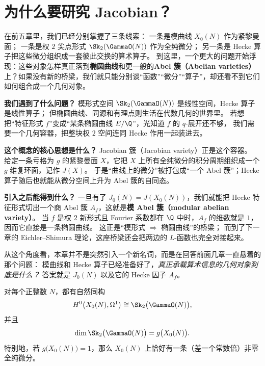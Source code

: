 \section{为什么要研究 Jacobian？}
\label{sec:jacobian-motivation}

在前五章里，我们已经分别掌握了三条线索：
一条是模曲线 $X_0(N)$ 作为紧黎曼面；
一条是权 $2$ 尖点形式 $\Sk_2(\GammaO(N))$ 作为全纯微分；
另一条是 Hecke 算子把这些微分组织成一套彼此交换的算术算子。
到这里，一个更大的问题开始浮现：这些对象怎样真正落到\textbf{椭圆曲线}和更一般的\textbf{Abel 簇（Abelian varieties）}上？如果没有新的桥梁，我们就只能分别谈“函数”“微分”“算子”，却还看不到它们如何组合成一个几何对象。

\textbf{我们遇到了什么问题？}
模形式空间 $\Sk_2(\GammaO(N))$ 是线性空间，Hecke 算子是线性算子；
但椭圆曲线、同源和有理点则生活在代数几何的世界里。
若想把“特征形式 $f$”变成“某条椭圆曲线 $E/\Q$”，光知道 $f$ 的 $q$-展开还不够，
我们需要一个几何容器，把整块权 $2$ 空间连同 Hecke 作用一起装进去。

\textbf{这个概念的核心思想是什么？}
Jacobian 簇（Jacobian variety）正是这个容器。
给定一条亏格为 $g$ 的紧黎曼面 $X$，它把 $X$ 上所有全纯微分的积分周期组织成一个 $g$ 维复环面，记作 $J(X)$。
于是“曲线上的微分”被打包成“一个 Abel 簇”；Hecke 算子随后也就能从微分空间上升为 Abel 簇的自同态。

\textbf{引入之后能得到什么？}
一旦有了 $J_0(N)=J(X_0(N))$，我们就能把 Hecke 特征形式切出一个商 Abel 簇
$A_f$，这就是\textbf{模 Abel 簇（modular abelian variety）}。
当 $f$ 是权 $2$ 新形式且 Fourier 系数都在 $\Q$ 中时，$A_f$ 的维数就是 $1$，因而它直接是一条椭圆曲线。
这正是“模形式 $\Rightarrow$ 椭圆曲线”的桥梁；
而到了下一章的 Eichler--Shimura 理论，这座桥梁还会把两边的 $L$-函数也完全对接起来。



从这个角度看，本章并不是突然引入一个新名词，而是在回答前面几章一直悬着的那个问题：
模曲线和 Hecke 算子已经准备好了，\emph{真正承载算术信息的几何对象到底是什么？}
答案就是 $J_0(N)$ 以及它的 Hecke 因子 $A_f$。

\begin{proposition}[前五章留下的权 $2$ 数据]
\label{prop:weight2-data-for-jacobian}
对每个正整数 $N$，都有自然同构
\[
  H^0\bigl(X_0(N),\Omega^1\bigr)\cong \Sk_2\bigl(\GammaO(N)\bigr),
\]
并且
\[
  \dim \Sk_2\bigl(\GammaO(N)\bigr)=g\bigl(X_0(N)\bigr).
\]
特别地，若 $g\bigl(X_0(N)\bigr)=1$，那么 $X_0(N)$ 上恰好有一条（差一个常数倍）非零全纯微分。
\end{proposition}

